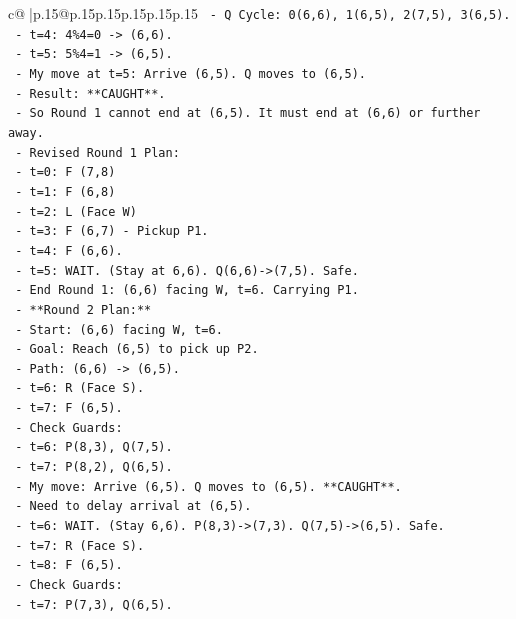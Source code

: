 \documentclass{article}
\begin{document}
{\begin{supertabular}{c@{$\;$}|p{.15\linewidth}@{}p{.15\linewidth}p{.15\linewidth}p{.15\linewidth}p{.15\linewidth}p{.15\linewidth}}
{{{\texttt{      {-} Q Cycle: 0(6,6), 1(6,5), 2(7,5), 3(6,5).} \\
\texttt{      {-} t=4: 4\%4=0 {-}> (6,6).} \\
\texttt{      {-} t=5: 5\%4=1 {-}> (6,5).} \\
\texttt{      {-} My move at t=5: Arrive (6,5). Q moves to (6,5).} \\
\texttt{      {-} Result: **CAUGHT**.} \\
\texttt{  {-} So Round 1 cannot end at (6,5). It must end at (6,6) or further away.} \\
\texttt{  {-} Revised Round 1 Plan:} \\
\texttt{    {-} t=0: F (7,8)} \\
\texttt{    {-} t=1: F (6,8)} \\
\texttt{    {-} t=2: L (Face W)} \\
\texttt{    {-} t=3: F (6,7) {-} Pickup P1.} \\
\texttt{    {-} t=4: F (6,6).} \\
\texttt{    {-} t=5: WAIT. (Stay at 6,6). Q(6,6){-}>(7,5). Safe.} \\
\texttt{    {-} End Round 1: (6,6) facing W, t=6. Carrying P1.} \\
\texttt{  {-} **Round 2 Plan:**} \\
\texttt{    {-} Start: (6,6) facing W, t=6.} \\
\texttt{    {-} Goal: Reach (6,5) to pick up P2.} \\
\texttt{    {-} Path: (6,6) {-}> (6,5).} \\
\texttt{    {-} t=6: R (Face S).} \\
\texttt{    {-} t=7: F (6,5).} \\
\texttt{      {-} Check Guards:} \\
\texttt{        {-} t=6: P(8,3), Q(7,5).} \\
\texttt{        {-} t=7: P(8,2), Q(6,5).} \\
\texttt{        {-} My move: Arrive (6,5). Q moves to (6,5). **CAUGHT**.} \\
\texttt{    {-} Need to delay arrival at (6,5).} \\
\texttt{    {-} t=6: WAIT. (Stay 6,6). P(8,3){-}>(7,3). Q(7,5){-}>(6,5). Safe.} \\
\texttt{    {-} t=7: R (Face S).} \\
\texttt{    {-} t=8: F (6,5).} \\
\texttt{      {-} Check Guards:} \\
\texttt{        {-} t=7: P(7,3), Q(6,5).} \\
}}}
\end{supertabular}}
\end{document}

